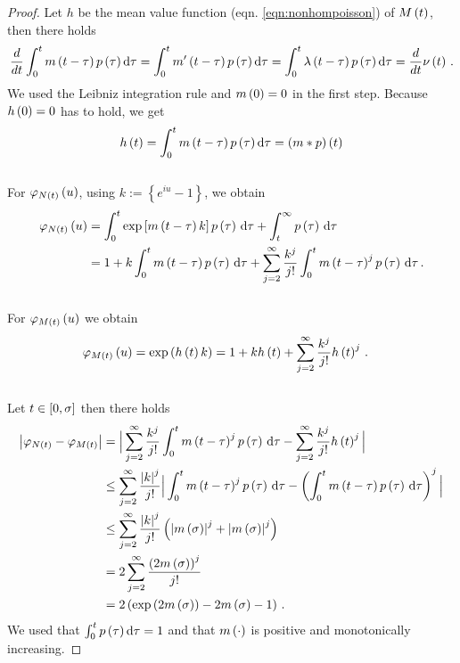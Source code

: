 \documentclass{amsart}
\numberwithin{equation}{section}
\begin{document}
\begin{proof}
Let $h$ be the mean value function (eqn. \eqref{eqn:nonhompoisson}) of $M\left(t\right)$, then there holds
\begin{align*}
\frac{d}{dt} \int_0^t m\left(t - \tau\right) p\left(\tau\right) \mathrm{d}\tau = \int_0^t m'\left(t - \tau\right) p \left(\tau\right) \mathrm{d}\tau = \int_0^t\lambda\left(t-\tau\right) p\left(\tau\right) \mathrm{d}\tau = \frac{d}{dt} \nu\left(t\right) \, .
\end{align*}
We used the Leibniz integration rule and $m\left(0\right) = 0$ in the first step. Because $h\left(0\right) = 0$ has to hold, we get
\begin{equation*}
h\left(t\right) = \int_0^t m\left(t - \tau\right) p\left(\tau\right) \mathrm{d}\tau = \left(m \ast p\right)\left(t\right)
\end{equation*}\\

\noindent For $\varphi_{N\left(t\right)}\left(u\right)$, using $k := \left\{e^{i u} - 1\right\}$, we obtain
\begin{align*}
\varphi_{N\left(t\right)}\left(u\right)
&=\int_0^t \exp\left[m\left(t - \tau\right) k\right] p \left(\tau\right) \, \mathrm{d}\tau + \int_t^\infty p \left(\tau\right) \, \mathrm{d}\tau \\
&= 1 + k \int_0^t m\left(t - \tau\right) p \left(\tau\right) \, \mathrm{d}\tau + \sum_{j=2}^\infty \frac{k^j}{j!} \int_0^t m\left(t - \tau\right)^j p \left(\tau\right) \, \mathrm{d}\tau \, .
\end{align*}\\

\noindent For $\varphi_{M\left(t\right)}\left(u\right)$ we obtain
\begin{align*}
\varphi_{M\left(t\right)}\left(u\right)
&= \exp\left(h\left(t\right) k\right)
= 1 + k h\left(t\right) + \sum_{j=2}^\infty \frac{k^j}{j!} h\left(t\right)^j \, .
\end{align*}\\

\noindent Let $t \in \left[0, \sigma\right]$ then there holds
\begin{align*}
\left|\varphi_{N\left(t\right)} - \varphi_{M\left(t\right)}\right|
&= \Big \vert \sum_{j=2}^\infty \frac{k^j}{j!} \int_0^t m\left(t - \tau\right)^j p \left(\tau\right) \, \mathrm{d}\tau - \sum_{j=2}^\infty \frac{k^j}{j!} h\left(t\right)^j \Big \vert \\
&\leq \sum_{j=2}^\infty \frac{\left|k\right|^j}{j!} \Big\vert \int_0^t m\left(t - \tau\right)^j p \left(\tau\right) \, \mathrm{d}\tau - \left( \int_0^t m\left(t - \tau\right) p \left(\tau\right) \, \mathrm{d}\tau \right)^j \Big\vert \\
&\leq \sum_{j=2}^\infty \frac{\left|k\right|^j}{j!} \left(\left|m\left(\sigma\right)\right|^j + \left|m\left(\sigma\right)\right|^j\right) \\
&=2 \sum_{j=2}^\infty \frac{\left(2 m\left(\sigma\right)\right)^j}{j!}\\
&=2 \left(\exp\left(2 m\left(\sigma\right)\right) - 2m\left(\sigma\right) - 1\right) \, .
\end{align*}
We used that $\int_0^t p\left(\tau\right) \mathrm{d}\tau = 1$ and that $m\left(\cdot\right)$ is positive and monotonically increasing.
\end{proof}
\end{document}
